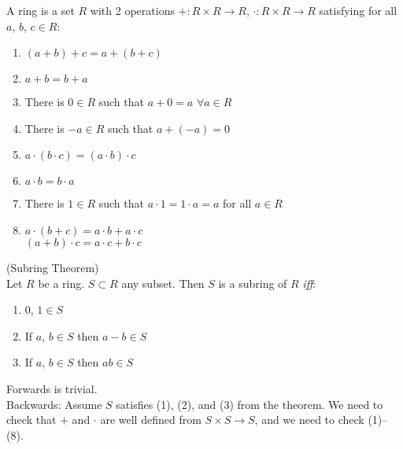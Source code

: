 \begin{small} A ring is a set $R$ with 2 operations $+\colon R\times R\to R$, $\cdot\colon R\times R\to R$ satisfying for all $a$, $b$, $c\in R$:
\begin{enumerate}[label=(\arabic*)]
\item $(a+b)+c=a+(b+c)$
\item $a+b=b+a$
\item There is $0\in R$ such that $a+0=a$ $\forall a\in R$
\item There is $-a\in R$ such that $a+(-a)=0$
\item $a\cdot(b\cdot c)=(a\cdot b)\cdot c$
\item $a\cdot b=b\cdot a$
\item There is $1\in R$ such that $a\cdot 1=1\cdot a=a$ for all $a\in R$
\item $a\cdot(b+c)=a\cdot b+a\cdot c$ \\
$(a+b)\cdot c=a\cdot c+b\cdot c$
\end{enumerate}\end{small}%
\thm (Subring Theorem) \\
Let $R$ be a ring.  $S\subset R$ any subset.  Then $S$ is a subring of $R$ \emph{iff}:
\begin{enumerate}[label=(\arabic*)]
\item $0$, $1\in S$
\item If $a$, $b\in S$ then $a-b\in S$
\item If $a$, $b\in S$ then $ab\in S$
\end{enumerate}
\pf Forwards is trivial. \\
Backwards: Assume $S$ satisfies (1), (2), and (3) from the theorem.  We need to check that $+$ and $\cdot$ are well defined from $S\times S\to S$, and we need to check (1)--(8).

